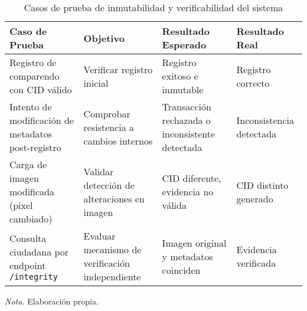 \begin{table}[htbp]
    \centering
    \caption{Casos de prueba de inmutabilidad y verificabilidad del sistema}
    \begin{tabular}{|p{4cm}|p{3cm}|p{3cm}|p{3cm}|}
        \hline
        \textbf{Caso de Prueba} & \textbf{Objetivo} & \textbf{Resultado Esperado} & \textbf{Resultado Real} \\
        \hline
        Registro de comparendo con CID válido & Verificar registro inicial & Registro exitoso e inmutable & Registro correcto \\
        \hline
        Intento de modificación de metadatos post-registro & Comprobar resistencia a cambios internos & Transacción rechazada o inconsistente detectada & Inconsistencia detectada \\
        \hline
        Carga de imagen modificada (pixel cambiado) & Validar detección de alteraciones en imagen & CID diferente, evidencia no válida & CID distinto generado \\
        \hline
        Consulta ciudadana por endpoint \texttt{/integrity} & Evaluar mecanismo de verificación independiente & Imagen original y metadatos coinciden & Evidencia verificada \\
        \hline
    \end{tabular}
    \vspace{1em}
    \begin{flushleft}
        \textit{Nota.} Elaboración propia.
    \end{flushleft}
\end{table}
